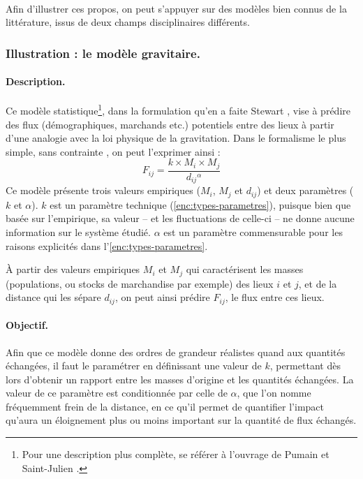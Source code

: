 \paragraph{}Afin d'illustrer ces propos, on peut s'appuyer sur des modèles bien connus de la littérature, issus de deux champs disciplinaires différents.

\subsubsection{Illustration : le modèle gravitaire.\label{desc:gravitaire}}

\paragraph{Description.}
Ce modèle statistique\footnote{Pour une description plus complète, se référer à l'ouvrage de Pumain et Saint-Julien \autocite{pumain_les_2001}.}, dans la formulation qu'en a faite Stewart \autocite{stewart_demographic_1948}, vise à prédire des flux (démographiques, marchands etc.) potentiels entre des lieux à partir d'une analogie avec la loi physique de la gravitation. Dans le formalisme le plus simple, \og sans contrainte\fg{} \autocite{pumain_les_2001}, on peut l'exprimer ainsi :
$$
F_{ij} = \frac{k \times M_{i} \times M_{j}}{d_{ij}{}^\alpha}
$$
Ce modèle présente trois valeurs empiriques ($M_i$, $M_j$ et $d_{ij}$) et deux paramètres ($k$ et $\alpha$). $k$ est un paramètre technique (\cref{enc:types-parametres}), puisque bien que basée sur l'empirique, sa valeur -- et les fluctuations de celle-ci -- ne donne aucune information sur le système étudié. $\alpha$ est un paramètre commensurable pour les raisons explicités dans l'\cref{enc:types-parametres}.

À partir des valeurs empiriques $M_i$ et $M_j$ qui caractérisent les masses (populations, ou stocks de  marchandise par exemple) des lieux $i$ et $j$, et de la distance qui les sépare $d_{ij}$, on peut ainsi prédire $F_{ij}$, le flux entre ces lieux.

\paragraph{Objectif.}
Afin que ce modèle donne des ordres de grandeur réalistes quand aux quantités échangées, il faut le paramétrer en définissant une valeur de $k$, permettant dès lors d'obtenir un rapport entre les masses d'origine et les quantités échangées.
La valeur de ce paramètre est conditionnée par celle de $\alpha$, que l'on nomme fréquemment \og frein de la distance\fg{}, en ce qu'il permet de quantifier l'impact qu'aura un éloignement plus ou moins important sur la quantité de flux échangés.

